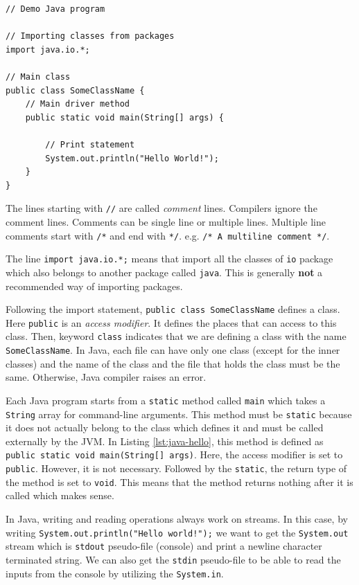\begin{lstlisting}[caption={Hello world example written in Java.},label=lst:java-hello]
// Demo Java program

// Importing classes from packages
import java.io.*;

// Main class
public class SomeClassName {
    // Main driver method
    public static void main(String[] args) {

        // Print statement
        System.out.println("Hello World!");
    }
}
\end{lstlisting}

The lines starting with \lstinline{//} are called \emph{comment} lines. Compilers ignore the comment lines. Comments can be single line or multiple lines. Multiple line comments start with \verb|/*| and end with \verb|*/|. e.g. \verb|/* A multiline comment */|.

The line \lstinline{import java.io.*;} means that import all the classes of \verb|io| package which also belongs to another package called \verb|java|. This is generally \textbf{not} a recommended way of importing packages.

Following the import statement, \lstinline{public class SomeClassName} defines a class. Here \verb|public| is an \emph{access modifier}. It defines the places that can access to this class. Then, keyword \verb|class| indicates that we are defining a class with the name \verb|SomeClassName|. In Java, each file can have only one class (except for the inner classes) and the name of the class and the file that holds the class must be the same. Otherwise, Java compiler raises an error.

Each Java program starts from a \verb|static| method called \verb|main| which takes a \verb|String| array for command-line arguments. This method must be \verb|static| because it does not actually belong to the class which defines it and must be called externally by the JVM. In Listing \ref{lst:java-hello}, this method is defined as \lstinline{public static void main(String[] args)}. Here, the access modifier is set to \verb|public|. However, it is not necessary. Followed by the \verb|static|, the return type of the method is set to \verb|void|. This means that the method returns nothing after it is called which makes sense.

In Java, writing and reading operations always work on streams. In this case, by writing \lstinline{System.out.println("Hello world!");} we want to get the \verb|System.out| stream which is \verb|stdout| pseudo-file (console) and print a newline character terminated string. We can also get the \verb|stdin| pseudo-file to be able to read the inputs from the console by utilizing the \verb|System.in|.

